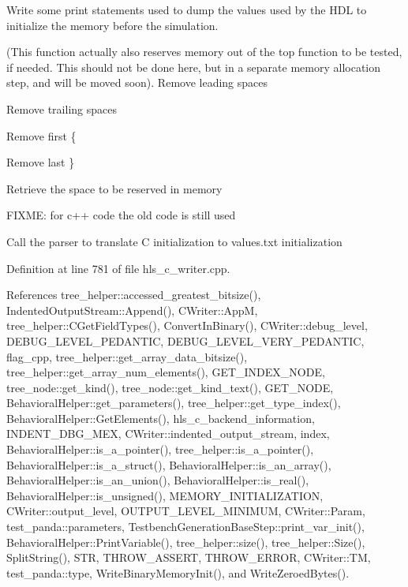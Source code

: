 Write some print statements used to dump the values used by the H\+DL to initialize the memory before the simulation. 

(This function actually also reserves memory out of the top function to be tested, if needed. This should not be done here, but in a separate memory allocation step, and will be moved soon). Remove leading spaces

Remove trailing spaces

Remove first \{

Remove last \}

Retrieve the space to be reserved in memory

F\+I\+X\+ME\+: for c++ code the old code is still used

Call the parser to translate C initialization to values.\+txt initialization 

Definition at line 781 of file hls\+\_\+c\+\_\+writer.\+cpp.



References tree\+\_\+helper\+::accessed\+\_\+greatest\+\_\+bitsize(), Indented\+Output\+Stream\+::\+Append(), C\+Writer\+::\+AppM, tree\+\_\+helper\+::\+C\+Get\+Field\+Types(), Convert\+In\+Binary(), C\+Writer\+::debug\+\_\+level, D\+E\+B\+U\+G\+\_\+\+L\+E\+V\+E\+L\+\_\+\+P\+E\+D\+A\+N\+T\+IC, D\+E\+B\+U\+G\+\_\+\+L\+E\+V\+E\+L\+\_\+\+V\+E\+R\+Y\+\_\+\+P\+E\+D\+A\+N\+T\+IC, flag\+\_\+cpp, tree\+\_\+helper\+::get\+\_\+array\+\_\+data\+\_\+bitsize(), tree\+\_\+helper\+::get\+\_\+array\+\_\+num\+\_\+elements(), G\+E\+T\+\_\+\+I\+N\+D\+E\+X\+\_\+\+N\+O\+DE, tree\+\_\+node\+::get\+\_\+kind(), tree\+\_\+node\+::get\+\_\+kind\+\_\+text(), G\+E\+T\+\_\+\+N\+O\+DE, Behavioral\+Helper\+::get\+\_\+parameters(), tree\+\_\+helper\+::get\+\_\+type\+\_\+index(), Behavioral\+Helper\+::\+Get\+Elements(), hls\+\_\+c\+\_\+backend\+\_\+information, I\+N\+D\+E\+N\+T\+\_\+\+D\+B\+G\+\_\+\+M\+EX, C\+Writer\+::indented\+\_\+output\+\_\+stream, index, Behavioral\+Helper\+::is\+\_\+a\+\_\+pointer(), tree\+\_\+helper\+::is\+\_\+a\+\_\+pointer(), Behavioral\+Helper\+::is\+\_\+a\+\_\+struct(), Behavioral\+Helper\+::is\+\_\+an\+\_\+array(), Behavioral\+Helper\+::is\+\_\+an\+\_\+union(), Behavioral\+Helper\+::is\+\_\+real(), Behavioral\+Helper\+::is\+\_\+unsigned(), M\+E\+M\+O\+R\+Y\+\_\+\+I\+N\+I\+T\+I\+A\+L\+I\+Z\+A\+T\+I\+ON, C\+Writer\+::output\+\_\+level, O\+U\+T\+P\+U\+T\+\_\+\+L\+E\+V\+E\+L\+\_\+\+M\+I\+N\+I\+M\+UM, C\+Writer\+::\+Param, test\+\_\+panda\+::parameters, Testbench\+Generation\+Base\+Step\+::print\+\_\+var\+\_\+init(), Behavioral\+Helper\+::\+Print\+Variable(), tree\+\_\+helper\+::size(), tree\+\_\+helper\+::\+Size(), Split\+String(), S\+TR, T\+H\+R\+O\+W\+\_\+\+A\+S\+S\+E\+RT, T\+H\+R\+O\+W\+\_\+\+E\+R\+R\+OR, C\+Writer\+::\+TM, test\+\_\+panda\+::type, Write\+Binary\+Memory\+Init(), and Write\+Zeroed\+Bytes().



